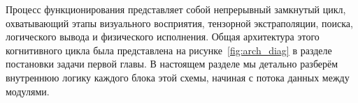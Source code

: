 Процесс функционирования представляет собой непрерывный замкнутый цикл, охватывающий этапы визуального восприятия, тензорной экстраполяции, поиска, логического вывода и физического исполнения. Общая архитектура этого когнитивного цикла была представлена на рисунке~\ref{fig:arch_diag} в разделе постановки задачи первой главы. В настоящем разделе мы детально разберём внутреннюю логику каждого блока этой схемы, начиная с потока данных между модулями.






